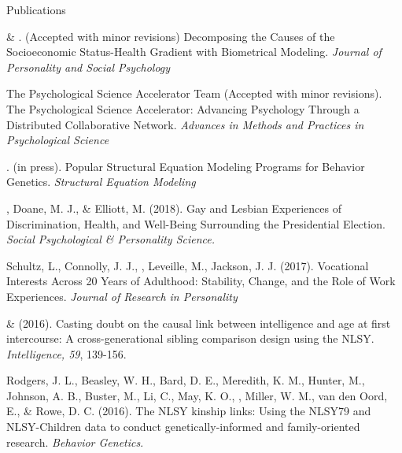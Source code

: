 \begin{rSection}{\textrm{Publications}}%
\begin{etaremune}
\item \meb \& \joe.  (Accepted with minor revisions) Decomposing the Causes of the Socioeconomic Status-Health Gradient with Biometrical Modeling.  \textit{Journal of Personality and Social Psychology} \href{https://osf.io/vd2kc/}{\color{blue}{https://osf.io/vd2kc/}}
\item The Psychological Science Accelerator Team (Accepted with minor revisions). The Psychological Science Accelerator: Advancing Psychology Through a Distributed Collaborative Network. \textit{Advances in Methods and Practices in Psychological Science} \href{https://psyarxiv.com/785qu/}{\color{blue}{https://psyarxiv.com/785qu/}}
\item \meb. (in press). Popular Structural Equation Modeling Programs for Behavior Genetics. \textit{Structural Equation Modeling} \href{}{\color{blue}{doi:10.1080/10705511.2018.1493385}}	
\item\meb, Doane, M. J., \& Elliott, M. (2018). Gay and Lesbian Experiences of Discrimination, Health, and Well-Being Surrounding the Presidential Election. \textit{Social Psychological \& Personality Science.}  \href{https://dx.doi.org/10.17605/OSF.IO/DWSCM}{\color{blue}{https://osf.io/dwscm/}}
\item Schultz, L., Connolly, J. J., \meb, Leveille, M., Jackson, J. J. (2017). Vocational Interests Across 20 Years of Adulthood: Stability, Change, and the Role of Work Experiences. \textit{Journal of Research in Personality}
\item\meb \& \Joe (2016). Casting doubt on the causal link between intelligence and age at first intercourse: A cross-generational sibling comparison design using the NLSY. \textit{Intelligence, 59}, 139-156. \href{http://www.sciencedirect.com/science/article/pii/S0160289616300162}{\color{blue}{doi:10.1016/j.intell.2016.08.008}}
\item Rodgers, J. L., Beasley, W. H., Bard, D. E., Meredith, K. M., Hunter, M., Johnson, A. B., Buster, M., Li, C., May, K. O., \meb, Miller, W. M., van den Oord, E., \& Rowe, D. C. (2016). The NLSY kinship links: Using the NLSY79 and NLSY-Children data to conduct genetically-informed and family-oriented research. \textit{Behavior Genetics}. \href{http://dx.doi.org/10.1007/s10519-016-9785-3}{\color{blue}{doi:10.1007/s10519-016-9785-3}}

\end{etaremune}
\end{rSection}
